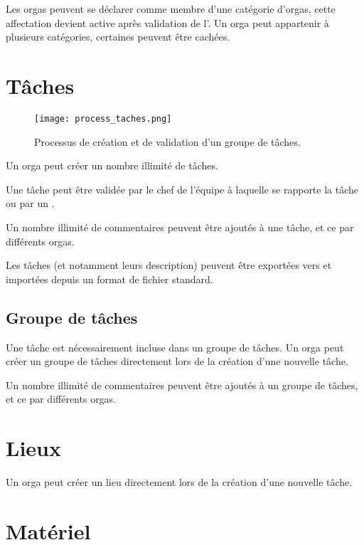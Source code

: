 Les orgas peuvent se déclarer comme membre d'une catégorie d'orgas, cette affectation devient active après validation de l'\oh{}. Un orga peut appartenir à plusieurs catégories, certaines peuvent être cachées.

\section{Tâches}

\begin{figure}[h!t]
\centering
\texttt{[image: process\_taches.png]}
\label{fig:ptaches}
\caption{Processus de création et de validation d'un groupe de tâches.}
\end{figure}
\clearpage

Un orga peut créer un nombre illimité de tâches.

Une tâche peut être validée par le chef de l'équipe à laquelle se rapporte la tâche ou par un \oh{}.

Un nombre illimité de commentaires peuvent être ajoutés à une tâche, et ce par différents orgas.

Les tâches (et notamment leurs description) peuvent être exportées vers et importées depuis un format de fichier standard.


\subsection{Groupe de tâches}
Une tâche est nécessairement incluse dans un groupe de tâches.
Un orga peut créer un groupe de tâches directement lors de la création d'une nouvelle tâche.

Un nombre illimité de commentaires peuvent être ajoutés à un groupe de tâches, et ce par différents orgas.

\section{Lieux}
Un orga peut créer un lieu directement lors de la création d'une nouvelle tâche.

\section{Matériel}

